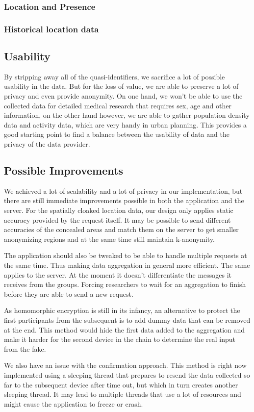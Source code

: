 \subsubsection{Location and Presence}
\subsubsection{Historical location data}
\subsection{Usability}
By stripping away all of the quasi-identifiers, we sacrifice a lot of possible usability in the data. But for the loss of value, we are able to preserve a lot of privacy and even provide anonymity. On one hand, we won't be able to use the collected data for detailed medical research that requires sex, age and other information, on the other hand however, we are able to gather population density data and activity data, which are very handy in urban planning. This provides a good starting point to find a balance between the usability of data and the privacy of the data provider.

\subsection{Possible Improvements}
We achieved a lot of scalability and a lot of privacy in our implementation, but there are still immediate improvements possible in both the application and the server. For the spatially cloaked location data, our design only applies static accuracy provided by the request itself. It may be possible to send different accuracies of the concealed areas and match them on the server to get smaller anonymizing regions and at the same time still maintain k-anonymity.

The application should also be tweaked to be able to handle multiple requests at the same time. Thus making data aggregation in general more efficient. The same applies to the server. At the moment it doesn't differentiate the messages it receives from the groups. Forcing researchers to wait for an aggregation to finish before they are able to send a new request.

As homomorphic encryption is still in its infancy, an alternative to protect the first participants from the subsequent is to add dummy data that can be removed at the end. This method would hide the first data added to the aggregation and make it harder for the second device in the chain to determine the real input from the fake.

We also have an issue with the confirmation approach. This method is right now implemented using a sleeping thread that prepares to resend the data collected so far to the subsequent device after time out, but which in turn creates another sleeping thread. It may lead to multiple threads that use a lot of resources and might cause the application to freeze or crash.

